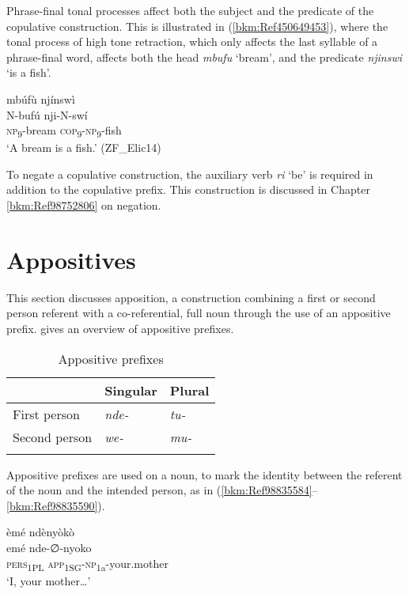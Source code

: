 Phrase-final tonal processes affect both the subject and the predicate of the copulative construction. This is illustrated in (\ref{bkm:Ref450649453}), where the tonal process of high tone retraction, which only affects the last syllable of a phrase-final word, affects both the head \textit{mbufu} ‘bream’, and the predicate \textit{njinswi} ‘is a fish’.

\ea
\label{bkm:Ref450649453}
mbúfù njínswì\\
\gll N-bufú  nji-N-swí\\
\textsc{np}\textsubscript{9}-bream  \textsc{cop}\textsubscript{9}-\textsc{np}\textsubscript{9}-fish\\
\glt ‘A bream is a fish.’ (ZF\_Elic14)
\z

To negate a copulative construction, the auxiliary verb \textit{ri} ‘be’ is required in addition to the copulative prefix. This construction is discussed in Chapter \ref{bkm:Ref98752806} on negation.

\section{Appositives}
\label{bkm:Ref492039371}\hypertarget{Toc75352655}{}
This section discusses apposition, a construction combining a first or second person referent with a co-referential, full noun through the use of an appositive prefix.  gives an overview of appositive prefixes.

\begin{table}
\label{bkm:Ref492039311}\caption{\label{tab:5:3}Appositive prefixes}
\begin{tabular}{lll}
\lsptoprule
& Singular & Plural\\
\midrule
First person & {\itshape nde-} & {\itshape tu-}\\
Second person & {\itshape we-} & {\itshape mu-}\\
\lspbottomrule
\end{tabular}
\end{table}

Appositive prefixes are used on a noun, to mark the identity between the referent of the noun and the intended person, as in (\ref{bkm:Ref98835584}--\ref{bkm:Ref98835590}).

\ea
\label{bkm:Ref98835584}
èmé ndènyòkò\\
\gll emé    nde-∅-nyoko\\
\textsc{pers}\textsubscript{1PL\-}  \textsc{app}\textsubscript{1SG}-\textsc{np}\textsubscript{1a}-your.mother\\
\glt ‘I, your mother…’
\z

